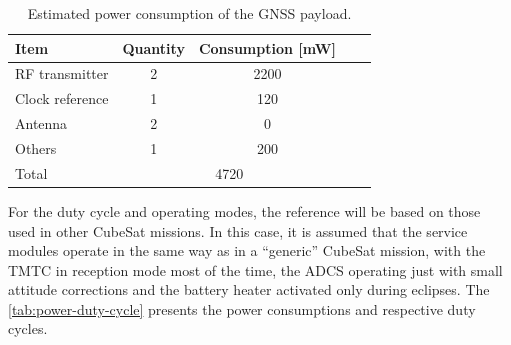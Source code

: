 \begin{table}[!ht]
    \centering
    \begin{tabular}{lcccc}
        \toprule[1.5pt]
        \textbf{Item} & \textbf{Quantity} & \textbf{Consumption [mW]} \\
        \midrule
        RF transmitter  & 2 & 2200 \\
        Clock reference & 1 & 120 \\
        Antenna         & 2 & 0 \\
        Others          & 1 & 200 \\
        \cmidrule{2-3}
        Total           & \multicolumn{2}{c}{4720} \\
        \bottomrule[1.5pt]
    \end{tabular}
    \caption{Estimated power consumption of the GNSS payload.}
    \label{tab:power-gnss-payload}
\end{table}


For the duty cycle and operating modes, the reference will be based on those used in other CubeSat missions. In this case, it is assumed that the service modules operate in the same way as in a ``generic'' CubeSat mission, with the TMTC in reception mode most of the time, the ADCS operating just with small attitude corrections and the battery heater activated only during eclipses. The \autoref{tab:power-duty-cycle} presents the power consumptions and respective duty cycles.

